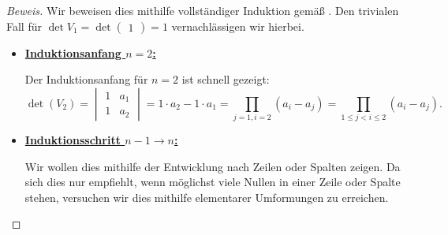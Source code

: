 \documentclass[12pt, a4paper, oneside, titlepage]{report}
\newenvironment{bew}{\begin{proof}[Beweis]}{\end{proof}}
\theoremstyle{definition}
\begin{document}
	\begin{bew}
		Wir beweisen dies mithilfe vollständiger Induktion gemäß \cite{vandermonde}. Den trivialen Fall für $ \det V_1 = \det \begin{pmatrix}1\end{pmatrix} = 1 $ vernachlässigen wir hierbei.
		
		\begin{itemize}
			\item {\underline{\textbf{Induktionsanfang $ n=2 $:}}
				
				Der Induktionsanfang für $ n=2 $ ist schnell gezeigt:
				$$ \det (V_2) = \begin{vmatrix}1&a_1\\1&a_2\end{vmatrix} = 1 \cdot a_2 - 1 \cdot a_1 = \prod_{j=1, i=2} (a_i-a_j) = \prod_{1 \leq j < i \leq 2} (a_i-a_j).$$
			}
			\item {\underline{\textbf{Induktionsschritt $ n - 1 \rightarrow n $:}}
				
				Wir wollen dies mithilfe der Entwicklung nach Zeilen oder Spalten zeigen. Da sich dies nur empfiehlt, wenn möglichst viele Nullen in einer Zeile oder Spalte stehen, versuchen wir dies mithilfe elementarer Umformungen zu erreichen.
				
}
\end{itemize}
\end{bew}
\end{document}

